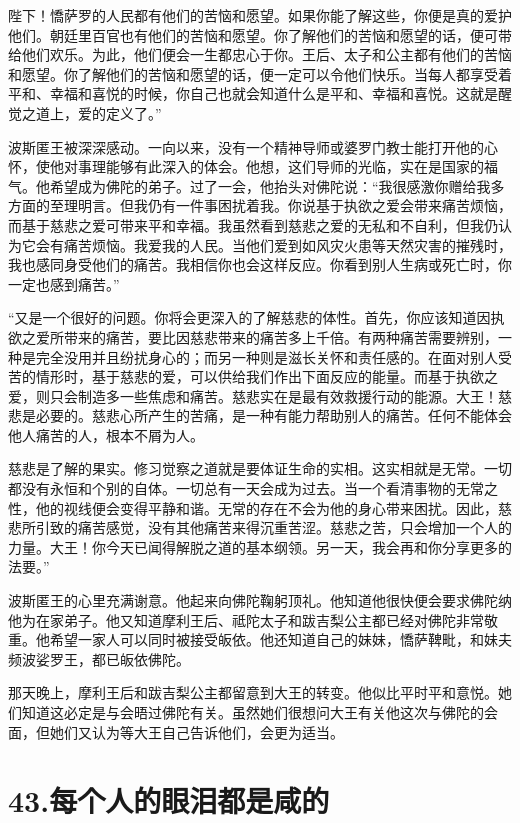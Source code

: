 \documentclass[12pt,twoside,openany]{book}
\begin{document}
陛下！憍萨罗的人民都有他们的苦恼和愿望。如果你能了解这些，你便是真的爱护他们。朝廷里百官也有他们的苦恼和愿望。你了解他们的苦恼和愿望的话，便可带给他们欢乐。为此，他们便会一生都忠心于你。王后、太子和公主都有他们的苦恼和愿望。你了解他们的苦恼和愿望的话，便一定可以令他们快乐。当每人都享受着平和、幸福和喜悦的时候，你自己也就会知道什么是平和、幸福和喜悦。这就是醒觉之道上，爱的定义了。”

波斯匿王被深深感动。一向以来，没有一个精神导师或婆罗门教士能打开他的心怀，使他对事理能够有此深入的体会。他想，这们导师的光临，实在是国家的福气。他希望成为佛陀的弟子。过了一会，他抬头对佛陀说：“我很感激你赠给我多方面的至理明言。但我仍有一件事困扰着我。你说基于执欲之爱会带来痛苦烦恼，而基于慈悲之爱可带来平和幸福。我虽然看到慈悲之爱的无私和不自利，但我仍认为它会有痛苦烦恼。我爱我的人民。当他们爱到如风灾火患等天然灾害的摧残时，我也感同身受他们的痛苦。我相信你也会这样反应。你看到别人生病或死亡时，你一定也感到痛苦。”

“又是一个很好的问题。你将会更深入的了解慈悲的体性。首先，你应该知道因执欲之爱所带来的痛苦，要比因慈悲带来的痛苦多上千倍。有两种痛苦需要辨别，一种是完全没用并且纷扰身心的；而另一种则是滋长关怀和责任感的。在面对别人受苦的情形时，基于慈悲的爱，可以供给我们作出下面反应的能量。而基于执欲之爱，则只会制造多一些焦虑和痛苦。慈悲实在是最有效救援行动的能源。大王！慈悲是必要的。慈悲心所产生的苦痛，是一种有能力帮助别人的痛苦。任何不能体会他人痛苦的人，根本不屑为人。

慈悲是了解的果实。修习觉察之道就是要体证生命的实相。这实相就是无常。一切都没有永恒和个别的自体。一切总有一天会成为过去。当一个看清事物的无常之性，他的视线便会变得平静和谐。无常的存在不会为他的身心带来困扰。因此，慈悲所引致的痛苦感觉，没有其他痛苦来得沉重苦涩。慈悲之苦，只会增加一个人的力量。大王！你今天已闻得解脱之道的基本纲领。另一天，我会再和你分享更多的法要。”

波斯匿王的心里充满谢意。他起来向佛陀鞠躬顶礼。他知道他很快便会要求佛陀纳他为在家弟子。他又知道摩利王后、祗陀太子和跋吉梨公主都已经对佛陀非常敬重。他希望一家人可以同时被接受皈依。他还知道自己的妹妹，憍萨鞞毗，和妹夫频波娑罗王，都已皈依佛陀。

那天晚上，摩利王后和跋吉梨公主都留意到大王的转变。他似比平时平和意悦。她们知道这必定是与会晤过佛陀有关。虽然她们很想问大王有关他这次与佛陀的会面，但她们又认为等大王自己告诉他们，会更为适当。


\chapter{43.每个人的眼泪都是咸的}\label{ch43}
\end{document}
